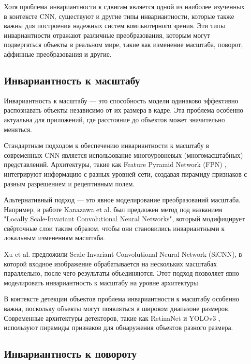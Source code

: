Хотя проблема инвариантности к сдвигам является одной из наиболее изученных в контексте CNN, существуют и другие типы инвариантности, которые также важны для построения надежных систем компьютерного зрения. Эти типы инвариантности отражают различные преобразования, которым могут подвергаться объекты в реальном мире, такие как изменение масштаба, поворот, аффинные преобразования и другие.

\subsection{Инвариантность к масштабу}
\label{review:other_invariance:scale}

Инвариантность к масштабу — это способность модели одинаково эффективно распознавать объекты независимо от их размера в кадре. Эта проблема особенно актуальна для приложений, где расстояние до объектов может значительно меняться.

Стандартным подходом к обеспечению инвариантности к масштабу в современных CNN является использование многоуровневых (многомасштабных) представлений. Архитектуры, такие как Feature Pyramid Network (FPN) \cite{Lin2017}, интегрируют информацию с разных уровней сети, создавая пирамиду признаков с разным разрешением и рецептивным полем.

Альтернативный подход — это явное моделирование преобразований масштаба. Например, в работе Kanazawa et al. \cite{Kanazawa2014} был предложен метод под названием "Locally Scale-Invariant Convolutional Neural Networks", который модифицирует свёрточные слои таким образом, чтобы они становились инвариантными к локальным изменениям масштаба.

Xu et al. \cite{Xu2014} предложили Scale-Invariant Convolutional Neural Network (SiCNN), в которой входное изображение обрабатывается на нескольких масштабах параллельно, после чего результаты объединяются. Этот подход позволяет явно моделировать инвариантность к масштабу на уровне архитектуры.

В контексте детекции объектов проблема инвариантности к масштабу особенно важна, поскольку объекты могут появляться в широком диапазоне размеров. Современные архитектуры детекторов, такие как RetinaNet \cite{Lin2017retinanet} и YOLOv3 \cite{Redmon2018}, используют пирамиды признаков для обнаружения объектов разного размера.

\subsection{Инвариантность к повороту}
\label{review:other_invariance:rotation}

